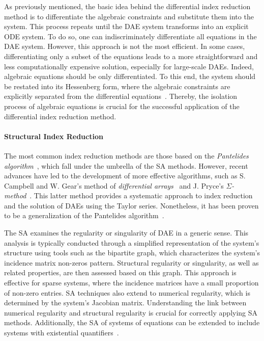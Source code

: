 As previously mentioned, the basic idea behind the differential index reduction method is to differentiate the algebraic constraints and substitute them into the system. This process repeats until the \ac{DAE} system transforms into an explicit \ac{ODE} system. To do so, one can indiscriminately differentiate all equations in the \ac{DAE} system. However, this approach is not the most efficient. In some cases, differentiating only a subset of the equations leads to a more straightforward and less computationally expensive solution, especially for large-scale \acp{DAE}. Indeed, algebraic equations should be only differentiated. To this end, the system should be restated into its Hessenberg form, where the algebraic constraints are explicitly separated from the differential equations~\cite{shmoylova2013simplification}. Thereby, the isolation process of algebraic equations is crucial for the successful application of the differential index reduction method.

\paragraph{Structural Index Reduction}

The most common index reduction methods are those based on the \emph{Pantelides algorithm}~\cite{pantelides1988consistent}, which fall under the umbrella of the \ac{SA} methods. However, recent advances have led to the development of more effective algorithms, such as S. Campbell and W. Gear's method of \emph{differential arrays}~\cite{campbell1995index} and J. Pryce's \emph{$\Sigma$-method}~\cite{pryce1998solving}. This latter method provides a systematic approach to index reduction and the solution of \acp{DAE} using the Taylor series. Nonetheless, it has been proven to be a generalization of the Pantelides algorithm~\cite{pryce2001simple}.

The \ac{SA} examines the regularity or singularity of \ac{DAE} in a generic sense. This analysis is typically conducted through a simplified representation of the system's structure using tools such as the bipartite graph, which characterizes the system's incidence matrix non-zeros pattern. Structural regularity or singularity, as well as related properties, are then assessed based on this graph. This approach is effective for sparse systems, where the incidence matrices have a small proportion of non-zero entries. \ac{SA} techniques also extend to numerical regularity, which is determined by the system's Jacobian matrix. Understanding the link between numerical regularity and structural regularity is crucial for correctly applying \ac{SA} methods. Additionally, the \ac{SA} of systems of equations can be extended to include systems with existential quantifiers~\cite{benveniste2021structural}.


